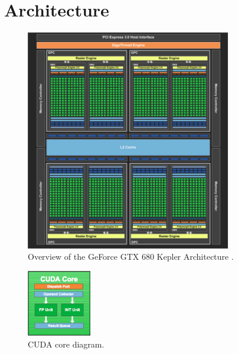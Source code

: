 \documentclass[../thesis]{subfiles}
\begin{document}
	\section{Architecture}
	\label{sec:cuda:arch}

	\begin{figure}[!htp]
		\centering
		\includegraphics[width=0.8\textwidth]{assets/images/cuda/arch/gtx680.png}
		\caption[Overview of the GeForce GTX 680 Kepler Architecture]{Overview of the GeForce GTX 680 Kepler Architecture \cite{NVIDIA:GTX680}.}
		\label{fig:gtx680}
	\end{figure}
	
	\begin{figure}
		\centering
		\includegraphics[width=0.25\textwidth]{assets/images/cuda/arch/cuda-core.png}
		\captionsetup{font=small}
		\caption{CUDA core diagram.}
		\label{fig:cudacore}
	\end{figure}
\end{document}
